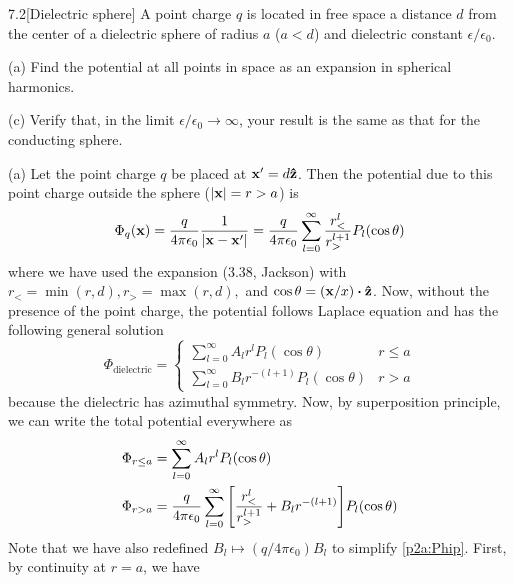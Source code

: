 \documentclass[12pt]{article}
\begin{document}
\begin{problem}{7.2}[Dielectric sphere]
A point charge $q$ is located in free space a distance $d$ from the center of a
dielectric sphere of radius $a$ ($a<d$) and dielectric constant $\epsilon
/\epsilon_0$.

(a) Find the potential at all points in space as an expansion in spherical
harmonics.

(c) Verify that, in the limit $\epsilon /\epsilon_0\to\infty$, your result is
the same as that for the conducting sphere.
\begin{solution}
(a) Let the point charge $q$ be placed at $\vb{x}'=d\vb{\hat{z}}$. Then the
potential due to this point charge outside the sphere ($\abs{\vb{x}}=r>a$) is
\begin{equation}
    \Phi_q(\vb{x})=\frac{q}{4\pi\epsilon_0}\frac1{\abs{\vb{x}-\vb{x}'}} 
    =\frac{q}{4\pi\epsilon_0}\sum_{l=0}^\infty\frac{r_<^l}{r_>^{l+1}}P_l(\cos\theta)
\end{equation}
where we have used the expansion (3.38, Jackson) with $r_< =\min(r,d),r_>
=\max(r,d),$ and $\cos\theta=(\vb{x}
/x)\vdot\zhat$. Now, without the presence of the point charge, the potential
follows Laplace equation and has the following general solution
\begin{equation}
    \Phi_{\text{dielectric}}=\begin{cases}
        \sum_{l=0}^\infty A_lr^lP_l(\cos\theta) & r\leq a\\
        \sum_{l=0}^\infty B_lr^{-(l+1)}P_l(\cos\theta) & r>a
    \end{cases}
\end{equation}
because the dielectric has azimuthal symmetry. Now, by superposition principle,
we can write the total potential everywhere as
\begin{subequations}\label{p2a:Phi}
    \begin{align}
        \Phi_{r\leq a}&=\sum_{l=0}^\infty A_lr^lP_l(\cos\theta)\\
        \Phi_{r>a}&=\frac{q}{4\pi\epsilon_0}\sum_{l=0}^\infty\qty[\frac{r_<^l}{r_>^{l+1}}+B_lr^{-(l+1)}]P_l(\cos\theta)\label{p2a:Phip}
    \end{align} 
\end{subequations}
Note that we have also redefined $B_l\mapsto (q /4\pi\epsilon_0)B_l$ to
simplify \eqref{p2a:Phip}. First, by continuity at $r=a$, we have
\begin{equation}\label{p2a:Al1}

\end{equation}
\end{solution}
\end{problem}
\end{document}
